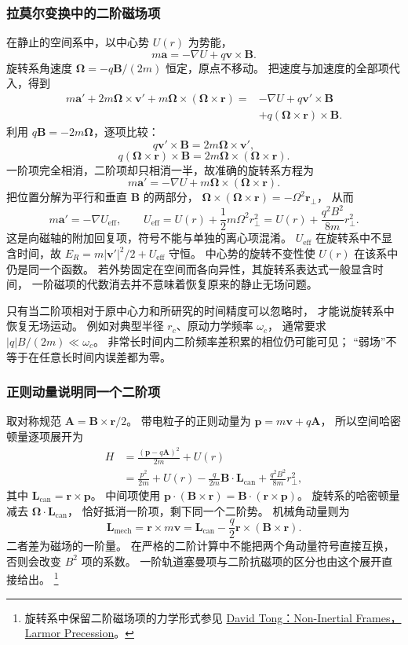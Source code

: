 \documentclass[UTF8,zihao=-4,fontset=fandol,a4paper]{ctexart}
\newcommand{\vect}[1]{\bm{#1}}
\begin{document}
\subsubsection*{拉莫尔变换中的二阶磁场项}
在静止的空间系中，以中心势 $U(r)$ 为势能，
\[
m\vect a=-\nabla U+q\vect v\times\vect B.
\]
旋转系角速度 $\vect\Omega=-q\vect B/(2m)$ 恒定，原点不移动。
把速度与加速度的全部项代入，得到
\[
\begin{aligned}
m\vect a'+2m\vect\Omega\times\vect v'
+m\vect\Omega\times(\vect\Omega\times\vect r)
={}&-\nabla U+q\vect v'\times\vect B\\
&+q(\vect\Omega\times\vect r)\times\vect B.
\end{aligned}
\]
利用 $q\vect B=-2m\vect\Omega$，逐项比较：
\[
q\vect v'\times\vect B=2m\vect\Omega\times\vect v',
\]
\[
q(\vect\Omega\times\vect r)\times\vect B
=2m\vect\Omega\times(\vect\Omega\times\vect r).
\]
一阶项完全相消，二阶项却只相消一半，故准确的旋转系方程为
\[
m\vect a'=-\nabla U+m\vect\Omega\times(\vect\Omega\times\vect r).
\]
把位置分解为平行和垂直 $\vect B$ 的两部分，
$\vect\Omega\times(\vect\Omega\times\vect r)=-\Omega^2\vect r_\perp$，
从而
\[
m\vect a'=-\nabla U_{\text{eff}},\qquad
U_{\text{eff}}=U(r)+\frac12m\Omega^2r_\perp^2
=U(r)+\frac{q^2B^2}{8m}r_\perp^2.
\]
这是向磁轴的附加回复项，符号不能与单独的离心项混淆。
$U_{\text{eff}}$ 在旋转系中不显含时间，故
$E_R=m|\vect v'|^2/2+U_{\text{eff}}$ 守恒。
中心势的旋转不变性使 $U(r)$ 在该系中仍是同一个函数。
若外势固定在空间而各向异性，其旋转系表达式一般显含时间，
一阶磁项的代数消去并不意味着恢复原来的静止无场问题。

只有当二阶项相对于原中心力和所研究的时间精度可以忽略时，
才能说旋转系中恢复无场运动。
例如对典型半径 $r_c$、原动力学频率 $\omega_c$，
通常要求 $|q|B/(2m)\ll\omega_c$。
非常长时间内二阶频率差积累的相位仍可能可见；
“弱场”不等于在任意长时间内误差都为零。

\subsubsection*{正则动量说明同一个二阶项}
取对称规范 $\vect A=\vect B\times\vect r/2$。
带电粒子的正则动量为 $\vect p=m\vect v+q\vect A$，
所以空间哈密顿量逐项展开为
\[
\begin{aligned}
H&=\frac{(\vect p-q\vect A)^2}{2m}+U(r)\\
&=\frac{p^2}{2m}+U(r)-\frac q{2m}\vect B\cdot\vect L_{\text{can}}
+\frac{q^2B^2}{8m}r_\perp^2,
\end{aligned}
\]
其中 $\vect L_{\text{can}}=\vect r\times\vect p$。
中间项使用 $\vect p\cdot(\vect B\times\vect r)=\vect B\cdot(\vect r\times\vect p)$。
旋转系的哈密顿量减去 $\vect\Omega\cdot\vect L_{\text{can}}$，
恰好抵消一阶项，剩下同一个二阶势。
机械角动量则为
\[
\vect L_{\text{mech}}=\vect r\times m\vect v
=\vect L_{\text{can}}-\frac q2\vect r\times(\vect B\times\vect r).
\]
二者差为磁场的一阶量。
在严格的二阶计算中不能把两个角动量符号直接互换，
否则会改变 $B^2$ 项的系数。
一阶轨道塞曼项与二阶抗磁项的区分也由这个展开直接给出。
\footnote{旋转系中保留二阶磁场项的力学形式参见
\href{https://www.damtp.cam.ac.uk/user/tong/relativity/six.pdf}{David Tong：Non-Inertial Frames，Larmor Precession}。}
\end{document}
